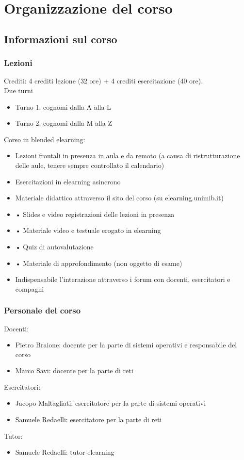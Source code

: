 \chapter{Organizzazione del corso}
\section{Informazioni sul corso}
\subsection{Lezioni}
Crediti: 4 crediti lezione (32 ore) + 4 crediti esercitazione (40 ore).\\
Due turni
\begin{itemize}
    \item Turno 1: cognomi dalla A alla L
    \item Turno 2: cognomi dalla M alla Z
\end{itemize}
Corso in blended elearning:
\begin{itemize}
    \item Lezioni frontali in presenza in aula e da remoto (a causa di ristrutturazione delle aule, tenere sempre controllato il calendario)
    \item Esercitazioni in elearning asincrono
    \item Materiale didattico attraverso il sito del corso (su elearning.unimib.it)
    \item  • Slides e video registrazioni delle lezioni in presenza
    \item  • Materiale video e testuale erogato in elearning
    \item  • Quiz di autovalutazione
    \item  • Materiale di approfondimento (non oggetto di esame)
    \item Indispensabile l'interazione attraverso i forum con docenti, esercitatori e compagni
\end{itemize}

\subsection{Personale del corso}
Docenti:
\begin{itemize}
    \item Pietro Braione: docente per la parte di sistemi operativi e responsabile del corso
    \item Marco Savi: docente per la parte di reti
\end{itemize}
Esercitatori:
\begin{itemize}
    \item Jacopo Maltagliati: esercitatore per la parte di sistemi operativi
    \item Samuele Redaelli: esercitatore per la parte di reti
\end{itemize}
Tutor:
\begin{itemize}
    \item Samuele Redaelli: tutor elearning
\end{itemize}

